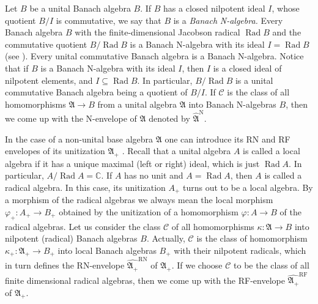 \documentclass[12pt]{amsart}%
\theoremstyle{plain}
\numberwithin{equation}{section}
\numberwithin{equation}{section}
\numberwithin{theorem}{section}
\numberwithin{lemma}{section}
\numberwithin{remark}{section}
\numberwithin{example}{section}
\numberwithin{proposition}{section}
\numberwithin{definition}{section}
\numberwithin{corollary}{section}
\begin{document}
Let $B$ be a unital Banach algebra $B$. If $B$ has a closed nilpotent ideal
$I$, whose quotient $B/I$ is commutative, we say that $B$ is a \textit{Banach}
\textit{N-algebra. }Every Banach algebra $B$ with the finite-dimensional
Jacobson radical $\operatorname{Rad}B$ and the commutative quotient
$B/\operatorname{Rad}B$ is a Banach N-algebra with its ideal
$I=\operatorname{Rad}B$ (see \cite[1.3.59]{Hel}). Every unital commutative
Banach algebra is a Banach N-algebra. Notice that if $B$ is a Banach N-algebra
with its ideal $I$, then $I$ is a closed ideal of nilpotent elements, and
$I\subseteq\operatorname{Rad}B$. In particular, $B/\operatorname{Rad}B$ is a
unital commutative Banach algebra being a quotient of $B/I$. If $\mathcal{C}$
is the class of all homomorphisms $\mathfrak{A}\rightarrow B$ from a unital
algebra $\mathfrak{A}$ into Banach N-algebras $B$, then we come up with the
N-envelope of $\mathfrak{A}$ denoted by $\widehat{\mathfrak{A}}^{\text{N}}$.

In the case of a non-unital base algebra $\mathfrak{A}$ one can introduce its
RN and RF envelopes of its unitization $\mathfrak{A}_{+}$ \cite{DosiSS}.
Recall that a unital algebra $A$ is called a local algebra if it has a unique
maximal (left or right) ideal, which is just $\operatorname{Rad}A$. In
particular, $A/\operatorname{Rad}A=\mathbb{C}$. If $A$ has no unit and
$A=\operatorname{Rad}A$, then $A$ is called a radical algebra. In this case,
its unitization $A_{+}$ turns out to be a local algebra. By a morphism of the
radical algebras we always mean the local morphism $\varphi_{+}:A_{+}%
\rightarrow B_{+}$ obtained by the unitization of a homomorphism
$\varphi:A\rightarrow B$ of the radical algebras. Let us consider the class
$\mathcal{C}$ of all homomorphisms $\kappa:\mathfrak{A}\rightarrow B$ into
nilpotent (radical) Banach algebras $B$. Actually, $\mathcal{C}$ is the class
of homomorphism $\kappa_{+}:\mathfrak{A}_{+}\rightarrow B_{+}$ into local
Banach algebras $B_{+}$ with their nilpotent radicals, which in turn defines
the RN-envelope $\widehat{\mathfrak{A}_{+}}^{\text{RN}}$ of $\mathfrak{A}_{+}%
$. If we choose $\mathcal{C}$ to be the class of all finite dimensional
radical algebras, then we come up with the RF-envelope $\widehat{\mathfrak{A}%
_{+}}^{\text{RF}}$ of $\mathfrak{A}_{+}$.
\end{document}
